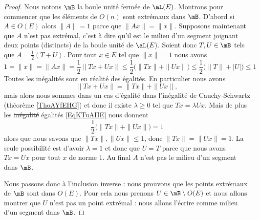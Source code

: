 \begin{proof}
    Nous notons \( \mB\) la boule unité fermée de \( \aL(E)\). Montrons pour commencer que les éléments de \( O(n)\) sont extrémaux dans \( \mB\). D'abord si \( A\in O(E)\) alors \( \| A \|=1\) parce que \( \| Ax \|=\| x \|\). Supposons maintenant que \( A\) n'est pas extrémal, c'est à dire qu'il est le milieu d'un segment joignant deux points (distincts) de la boule unité de \( \aL(E)\). Soient donc \( T,U\in\mB\) tels que \( A=\frac{ 1 }{2}(T+U)\). Pour tout \( x\in E\) tel que \( \| x \|=1\) nous avons 
    \begin{equation}    \label{EqKTuAIIE}
        1=\| x \|=\| Ax \|=\frac{ 1 }{2}\| Tx+Ux \|\leq \frac{ 1 }{2}\big( \| Tx \|+\| Ux \| \big)\leq\frac{ 1 }{2}\big( \| T \|+| U | \big)\leq 1
    \end{equation}
    Toutes les inégalités sont en réalité des égalités. En particulier nous avons
    \begin{equation}
        \| Tx+Ux \|=\| Tx \|+\| Ux \|,
    \end{equation}
    mais alors nous sommes dans un cas d'égalité dans l'inégalité de Cauchy-Schwartz (théorème \ref{ThoAYfEHG}) et donc il existe \( \lambda\geq 0\) tel que \( Tx=\lambda Ux\). Mais de plus les \sout{inégalité} égalités \eqref{EqKTuAIIE} nous donnent
    \begin{equation}
        \frac{ 1 }{2}\big( \| Tx \|+\| Ux \| \big)=1
    \end{equation}
    alors que nous savons que \( \| Tx \|,\| Ux \|\leq 1\), donc \( \| Tx \|=\| Ux \|=1\). La seule possibilité est d'avoir \( \lambda=1\) et donc que \( U=T\) parce que nous avons \( Tx=Ux\) pour tout \( x\) de norme \( 1\). Au final \( A\) n'est pas le milieu d'un segment dans \( \mB\).

    Nous passons donc à l'inclusion inverse : nous prouvons que les points extrémaux de \( \mB\) sont dans \( O(E)\). Pour cela nous prenons \( U\in\mB\setminus O(E)\) et nous allons montrer que \( U\) n'est pas un point extrémal : nous allons l'écrire comme milieu d'un segment dans \( \mB\).


\end{proof}
